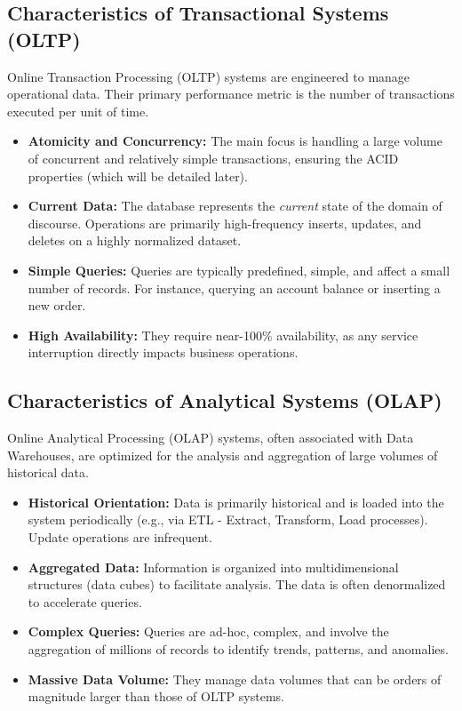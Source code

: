 \subsection{Characteristics of Transactional Systems (OLTP)}
Online Transaction Processing (OLTP) systems are engineered to manage operational data. Their primary performance metric is the number of transactions executed per unit of time.
\begin{itemize}
    \item \textbf{Atomicity and Concurrency:} The main focus is handling a large volume of concurrent and relatively simple transactions, ensuring the ACID properties (which will be detailed later).
    \item \textbf{Current Data:} The database represents the \textit{current} state of the domain of discourse. Operations are primarily high-frequency inserts, updates, and deletes on a highly normalized dataset.
    \item \textbf{Simple Queries:} Queries are typically predefined, simple, and affect a small number of records. For instance, querying an account balance or inserting a new order.
    \item \textbf{High Availability:} They require near-100\% availability, as any service interruption directly impacts business operations.
\end{itemize}

\subsection{Characteristics of Analytical Systems (OLAP)}
Online Analytical Processing (OLAP) systems, often associated with Data Warehouses, are optimized for the analysis and aggregation of large volumes of historical data.
\begin{itemize}
    \item \textbf{Historical Orientation:} Data is primarily historical and is loaded into the system periodically (e.g., via ETL - Extract, Transform, Load processes). Update operations are infrequent.
    \item \textbf{Aggregated Data:} Information is organized into multidimensional structures (data cubes) to facilitate analysis. The data is often denormalized to accelerate queries.
    \item \textbf{Complex Queries:} Queries are ad-hoc, complex, and involve the aggregation of millions of records to identify trends, patterns, and anomalies.
    \item \textbf{Massive Data Volume:} They manage data volumes that can be orders of magnitude larger than those of OLTP systems.
\end{itemize}

